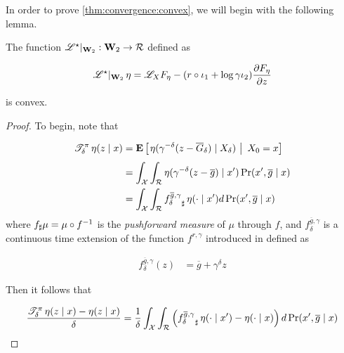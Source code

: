In order to prove \ref{thm:convergence:convex}, we will begin with the following
lemma.

\begin{lemma}\label{lem:convex}
  The function $\mathscr{L}^\star\rvert_{\mathbf{W}_{2}}: \mathbf{W}_{2}\to\operatorname{\mathcal{R}}$ defined as

  \begin{equation}
    \label{eq:lstar}
    \mathscr{L}^\star\rvert_{\wasserspace}\returnmeasure =
    \mathscr{L}_X\cdf[\returnmeasure] - (r\circ\proj{1} +
    \log\gamma\proj{2})\partialderiv{\cdf[\returnmeasure]}{z}
  \end{equation}

  is convex.
\end{lemma}
\begin{proof}
  To begin, note that

  \begin{align*}
    \mathscr{T}^{\pi}_\delta\operatorname{\eta}(z\mid x)
    &= \underset{}{\mathbf{E}}\left[\left. \operatorname{\eta}(\gamma^{-\delta}(z -
      \overline{G}_\delta)\mid X_\delta)\ \right\rvert\ X_0=x\right]\\
    &=
      \int_{\mathcal{X}}\int_{\operatorname{\mathcal{R}}}\operatorname{\eta}(\gamma^{-\delta}(z
      - \overline{g})\mid x')\Pr(x', \overline{g}\mid x)\\
    &=
      \int_{\mathcal{X}}\int_{\operatorname{\mathcal{R}}}{f^{\overline{g},
      \gamma}_{\delta}}_\sharp \operatorname{\eta}(\cdot\mid x')d\Pr(x', \overline{g}\mid x)\\
  \end{align*}
  where ${f}_\sharp \mu = \mu\circ f^{-1}$ is the
  \emph{pushforward measure} of $\mu$ through $f$, and
  $f^{\overline{g}, \gamma}_{\delta}$ is a continuous time extension of
  the function $f^{r, \gamma}$ introduced in \citet{Rowland48495}
  defined as

  \begin{align*}
    f^{\overline{g},\gamma}_{\delta}(z) &= \overline{g} + \gamma^{\delta}z
  \end{align*}

  Then it follows that

  \begin{align*}
    \frac{\mathscr{T}^{\pi}_\delta\operatorname{\eta}(z\mid x) -
    \operatorname{\eta}(z\mid x)}{\delta}
    &=
      \frac{1}{\delta}\int_{\mathcal{X}}\int_{\operatorname{\mathcal{R}}}\left({f^{\overline{g},
      \gamma}_{\delta}}_\sharp \operatorname{\eta}(\cdot\mid x') -
      \operatorname{\eta}(\cdot\mid x)\right)d\Pr(x', \overline{g}\mid x)\\
  \end{align*}


\end{proof}
